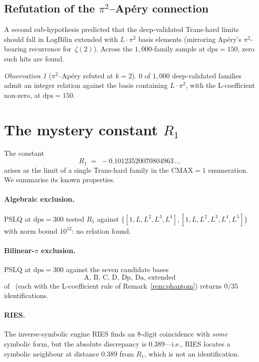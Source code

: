 \documentclass[11pt,a4paper]{amsart}
\theoremstyle{definition}
\theoremstyle{remark}
\newtheorem{observation}[theorem]{Observation}
\newcommand{\dps}{\mathrm{dps}}
\begin{document}
\subsection{Refutation of the $\pi^2$--Ap\'ery connection}

A second sub-hypothesis predicted that the deep-validated Trans-hard
limits should fall in $\mathrm{LogBilin}$ extended with $L\cdot\pi^2$
basis elements (mirroring Ap\'ery's $\pi^2$-bearing recurrence
for~$\zeta(2)$).  Across the $1{,}000$-family sample at $\dps=150$,
zero such hits are found.

\begin{observation}[$\pi^2$--Ap\'ery refuted at $k=2$]
\label{obs:apery-refuted}
$0$ of $1{,}000$ deep-validated families admit an integer relation
against the basis containing $L\cdot\pi^2$, with the L-coefficient
non-zero, at $\dps=150$.
\end{observation}

\section{The mystery constant $R_1$}\label{sec:R1}

The constant
\[
  R_1 \;=\; -0.10123520070804963\,\ldots
\]
arises as the limit of a single Trans-hard family in the
$\mathrm{CMAX}=1$ enumeration.  We summarise its known properties.

\paragraph{Algebraic exclusion.}
PSLQ at $\dps=300$ tested $R_1$ against
$\{[1,L,L^2,L^3,L^4],[1,L,L^2,L^3,L^4,L^5]\}$ with norm bound $10^{12}$:
no relation found.

\paragraph{Bilinear-$\pi$ exclusion.}
PSLQ at $\dps=300$ against the seven candidate bases
\[
  \mathrm{A,\,B,\,C,\,D,\,Dp,\,Da,\,extended}
\]
of~\cite{PCF24} (each with the L-coefficient rule of
Remark~\ref{rem:phantom}) returns $0/35$ identifications.

\paragraph{RIES.}
The inverse-symbolic engine RIES finds an $8$-digit coincidence with
\emph{some} symbolic form, but the absolute discrepancy is
$0.389$---i.e., RIES locates a symbolic neighbour at distance
$0.389$ from $R_1$, which is not an identification.
\end{document}
